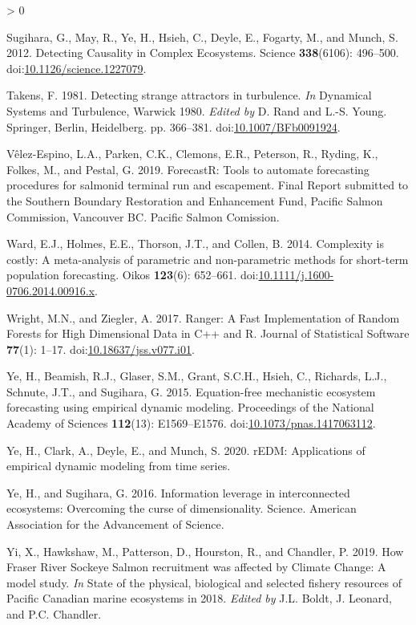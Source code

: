 \documentclass[
]{article}
\newlength{\cslhangindent}
\newenvironment{CSLReferences}[2] %
 {%
  \setlength{\parindent}{0pt}
  \ifodd #1 \everypar{\setlength{\hangindent}{\cslhangindent}}\ignorespaces\fi
  \ifnum #2 > 0
  \setlength{\parskip}{#2\baselineskip}
  \fi
 }%
 {}
\begin{document}
\begin{CSLReferences}{1}{0}
\leavevmode\hypertarget{ref-sugihara2012}{}%
Sugihara, G., May, R., Ye, H., Hsieh, C., Deyle, E., Fogarty, M., and Munch, S. 2012. Detecting {Causality} in {Complex Ecosystems}. Science \textbf{338}(6106): 496--500. doi:\href{https://doi.org/10.1126/science.1227079}{10.1126/science.1227079}.

\leavevmode\hypertarget{ref-takens1981}{}%
Takens, F. 1981. Detecting strange attractors in turbulence. \emph{In} Dynamical {Systems} and {Turbulence}, {Warwick} 1980. \emph{Edited by} D. Rand and L.-S. Young. {Springer}, {Berlin, Heidelberg}. pp. 366--381. doi:\href{https://doi.org/10.1007/BFb0091924}{10.1007/BFb0091924}.

\leavevmode\hypertarget{ref-velez-espino2019}{}%
Vêlez-Espino, L.A., Parken, C.K., Clemons, E.R., Peterson, R., Ryding, K., Folkes, M., and Pestal, G. 2019. {ForecastR}: Tools to automate forecasting procedures for salmonid terminal run and escapement. {Final Report} submitted to the {Southern Boundary Restoration} and {Enhancement Fund}, {Pacific Salmon Commission}, {Vancouver BC}. {Pacific Salmon Comission}.

\leavevmode\hypertarget{ref-ward2014}{}%
Ward, E.J., Holmes, E.E., Thorson, J.T., and Collen, B. 2014. Complexity is costly: A meta-analysis of parametric and non-parametric methods for short-term population forecasting. Oikos \textbf{123}(6): 652--661. doi:\href{https://doi.org/10.1111/j.1600-0706.2014.00916.x}{10.1111/j.1600-0706.2014.00916.x}.

\leavevmode\hypertarget{ref-wright2017}{}%
Wright, M.N., and Ziegler, A. 2017. Ranger: {A Fast Implementation} of {Random Forests} for {High Dimensional Data} in {C}++ and {R}. Journal of Statistical Software \textbf{77}(1): 1--17. doi:\href{https://doi.org/10.18637/jss.v077.i01}{10.18637/jss.v077.i01}.

\leavevmode\hypertarget{ref-ye2015}{}%
Ye, H., Beamish, R.J., Glaser, S.M., Grant, S.C.H., Hsieh, C., Richards, L.J., Schnute, J.T., and Sugihara, G. 2015. Equation-free mechanistic ecosystem forecasting using empirical dynamic modeling. Proceedings of the National Academy of Sciences \textbf{112}(13): E1569--E1576. doi:\href{https://doi.org/10.1073/pnas.1417063112}{10.1073/pnas.1417063112}.

\leavevmode\hypertarget{ref-ye2020}{}%
Ye, H., Clark, A., Deyle, E., and Munch, S. 2020. rEDM: Applications of empirical dynamic modeling from time series.

\leavevmode\hypertarget{ref-ye2016}{}%
Ye, H., and Sugihara, G. 2016. Information leverage in interconnected ecosystems: {Overcoming} the curse of dimensionality. Science. {American Association for the Advancement of Science}.

\leavevmode\hypertarget{ref-yi2019}{}%
Yi, X., Hawkshaw, M., Patterson, D., Hourston, R., and Chandler, P. 2019. How {Fraser River Sockeye Salmon} recruitment was affected by {Climate Change}: {A} model study. \emph{In} State of the physical, biological and selected fishery resources of {Pacific Canadian} marine ecosystems in 2018. \emph{Edited by} J.L. Boldt, J. Leonard, and P.C. Chandler.

\end{CSLReferences}
\end{document}
